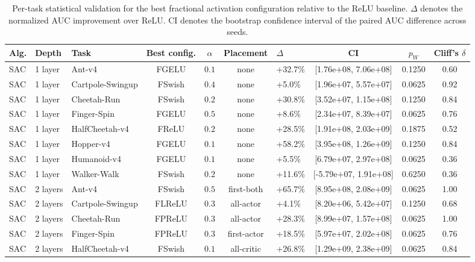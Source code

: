 \begin{table}[t]
\centering
\caption{Per-task statistical validation for the best fractional activation configuration relative to the ReLU baseline. $\Delta$ denotes the normalized AUC improvement over ReLU. CI denotes the bootstrap confidence interval of the paired AUC difference across seeds.}
\label{tab:stats-appendix}
\scriptsize
\setlength{\tabcolsep}{3pt}
\renewcommand{\arraystretch}{1.08}
\begin{tabularx}{\textwidth}{lllccclccc}
\toprule
\textbf{Alg.} & \textbf{Depth} & \textbf{Task} & \textbf{Best config.} & \textbf{$\alpha$} & \textbf{Placement} & \textbf{$\Delta$} & \textbf{CI} & \textbf{$p_W$} & \textbf{Cliff's $\delta$} \\
\midrule
SAC & 1 layer & Ant-v4 & FGELU & $0.1$ & none & +32.7\% & [1.76e+08, 7.06e+08] & 0.1250 & 0.60 \\
SAC & 1 layer & Cartpole-Swingup & FSwish & $0.4$ & none & +5.0\% & [1.96e+07, 5.57e+07] & 0.0625 & 0.92 \\
SAC & 1 layer & Cheetah-Run & FSwish & $0.2$ & none & +30.8\% & [3.52e+07, 1.15e+08] & 0.1250 & 0.84 \\
SAC & 1 layer & Finger-Spin & FGELU & $0.5$ & none & +8.6\% & [2.34e+07, 8.39e+07] & 0.0625 & 0.76 \\
SAC & 1 layer & HalfCheetah-v4 & FReLU & $0.2$ & none & +28.5\% & [1.91e+08, 2.03e+09] & 0.1875 & 0.52 \\
SAC & 1 layer & Hopper-v4 & FGELU & $0.1$ & none & +58.2\% & [3.95e+08, 1.26e+09] & 0.1250 & 0.84 \\
SAC & 1 layer & Humanoid-v4 & FGELU & $0.1$ & none & +5.5\% & [6.79e+07, 2.97e+08] & 0.0625 & 0.36 \\
SAC & 1 layer & Walker-Walk & FSwish & $0.2$ & none & +11.6\% & [-5.79e+07, 1.91e+08] & 0.6250 & 0.36 \\
SAC & 2 layers & Ant-v4 & FSwish & $0.5$ & first-both & +65.7\% & [8.95e+08, 2.08e+09] & 0.0625 & 1.00 \\
SAC & 2 layers & Cartpole-Swingup & FLReLU & $0.3$ & all-actor & +4.1\% & [8.20e+06, 5.42e+07] & 0.1250 & 0.68 \\
SAC & 2 layers & Cheetah-Run & FPReLU & $0.3$ & all-actor & +28.3\% & [8.99e+07, 1.57e+08] & 0.0625 & 1.00 \\
SAC & 2 layers & Finger-Spin & FPReLU & $0.3$ & first-actor & +18.5\% & [5.97e+07, 2.02e+08] & 0.0625 & 0.76 \\
SAC & 2 layers & HalfCheetah-v4 & FSwish & $0.1$ & all-critic & +26.8\% & [1.29e+09, 2.38e+09] & 0.0625 & 0.84 \\

\end{tabularx}
\end{table}
